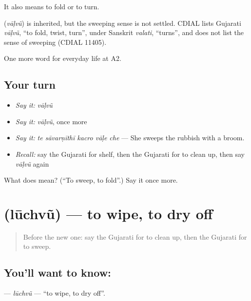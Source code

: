 It also means to fold or to turn.

\begin{cousinweb}
\textbf{} (\emph{vāḷvũ}) is inherited, but the sweeping sense is not settled. CDIAL lists Gujarati \emph{vāḷvũ}, \textquotedblleft{}to fold, twist, turn\textquotedblright{}, under Sanskrit \emph{valati}, \textquotedblleft{}turns\textquotedblright{}, and does not list the sense of sweeping (CDIAL 11405).
\end{cousinweb}

\begin{grammarlens}[title={What you've built}]
One more word for everyday life at A2.
\end{grammarlens}

\subsection*{Your turn}
\begin{itemize}
\raggedright
  \item \emph{Say it:} \emph{vāḷvũ}
  \item \emph{Say it:} \emph{vāḷvũ}, once more
  \item \emph{Say it:} \emph{te sāvarṇīthī kacro vāḷe che} — She sweeps the rubbish with a broom.
  \item \emph{Recall:} say the Gujarati for shelf, then the Gujarati for to clean up, then say \emph{vāḷvũ} again
\end{itemize}

\begin{tcolorbox}[breakable,colback=teal!4,colframe=teal!35!black,title={Before you move on}]
What does  mean? (\textquotedblleft{}To sweep, to fold\textquotedblright{}.) Say it once more.
\end{tcolorbox}
\section[\texorpdfstring{\gu{લૂછવું} (lūchvũ)}{લૂછવું (lūchvũ)}]{ (lūchvũ) — to wipe, to dry off}

\label{lesson:GU-C158-luchvu}



\begin{quote}
Before the new one: say the Gujarati for to clean up, then the Gujarati for to sweep.
\end{quote}

\subsection*{You'll want to know: }
\textbf{} — \emph{lūchvũ} — \textquotedblleft{}to wipe, to dry off\textquotedblright{}.

